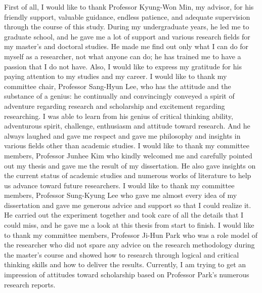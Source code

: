First of all, I would like to thank Professor Kyung-Won Min, my advisor, for his friendly support, valuable guidance, endless patience, and adequate supervision through the course of this study. During my undergraduate years, he led me to graduate school, and he gave me a lot of support and various research fields for my master's and doctoral studies. He made me find out only what I can do for myself as a researcher, not what anyone can do; he has trained me to have a passion that I do not have. Also, I would like to express my gratitude for his paying attention to my studies and my career. I would like to thank my committee chair, Professor Sang-Hyun Lee, who has the attitude and the substance of a genius: he continually and convincingly conveyed a spirit of adventure regarding research and scholarship and excitement regarding researching. I was able to learn from his genius of critical thinking ability, adventurous spirit, challenge, enthusiasm and attitude toward research. And he always laughed and gave me respect and gave me philosophy and insights in various fields other than academic studies. I would like to thank my committee members, Professor Junhee Kim who kindly welcomed me and carefully pointed out my thesis and gave me the result of my dissertation. He also gave insights on the current status of academic studies and numerous works of literature to help us advance toward future researchers. I would like to thank my committee members, Professor Sung-Kyung Lee who gave me almost every idea of my dissertation and gave me generous advice and support so that I could realize it. He carried out the experiment together and took care of all the details that I could miss, and he gave me a look at this thesis from start to finish. I would like to thank my committee members, Professor Ji-Hun Park who was a role model of the researcher who did not spare any advice on the research methodology during the master's course and showed how to research through logical and critical thinking skills and how to deliver the results. Currently, I am trying to get an impression of attitudes toward scholarship based on Professor Park's numerous research reports. 

